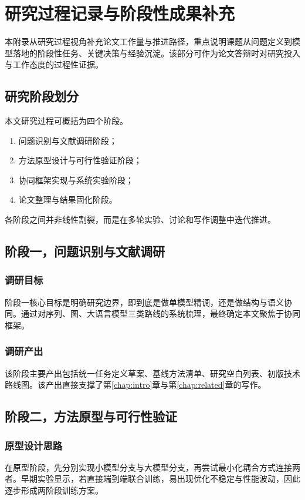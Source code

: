 \chapter{研究过程记录与阶段性成果补充}
\label{appx:progress}

本附录从研究过程视角补充论文工作量与推进路径，重点说明课题从问题定义到模型落地的阶段性任务、关键决策与经验沉淀。该部分可作为论文答辩时对研究投入与工作态度的过程性证据。

\section{研究阶段划分}
本文研究过程可概括为四个阶段。
\begin{enumerate}
    \item 问题识别与文献调研阶段；
    \item 方法原型设计与可行性验证阶段；
    \item 协同框架实现与系统实验阶段；
    \item 论文整理与结果固化阶段。
\end{enumerate}
\par\indent 各阶段之间并非线性割裂，而是在多轮实验、讨论和写作调整中迭代推进。

\section{阶段一，问题识别与文献调研}
\subsection{调研目标}
阶段一核心目标是明确研究边界，即到底是做单模型精调，还是做结构与语义协同。通过对序列、图、大语言模型三类路线的系统梳理，最终确定本文聚焦于协同框架。

\subsection{调研产出}
该阶段主要产出包括统一任务定义草案、基线方法清单、研究空白列表、初版技术路线图。该产出直接支撑了第\ref{chap:intro}章与第\ref{chap:related}章的写作。

\section{阶段二，方法原型与可行性验证}
\subsection{原型设计思路}
在原型阶段，先分别实现小模型分支与大模型分支，再尝试最小化耦合方式连接两者。早期实验显示，若直接端到端联合训练，易出现优化不稳定与性能波动，因此逐步形成两阶段训练方案。

